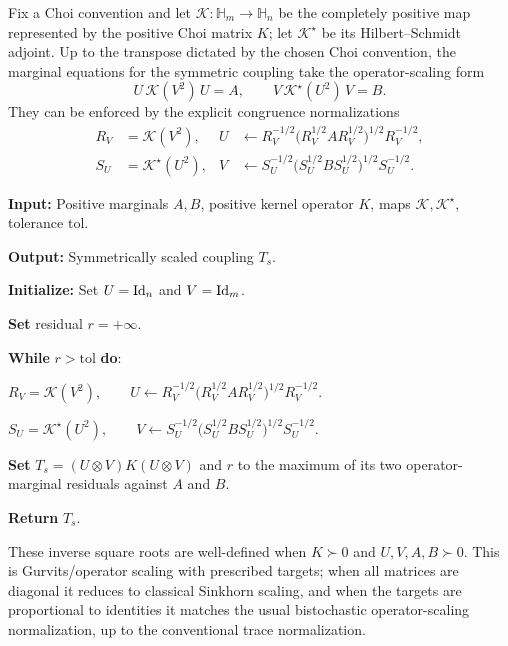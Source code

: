 Fix a Choi convention and let $\mathcal K:\mathbb H_m\to\mathbb H_n$ be the completely positive map represented by the positive Choi matrix $K$; let $\mathcal K^\star$ be its Hilbert--Schmidt adjoint. Up to the transpose dictated by the chosen Choi convention, the marginal equations for the symmetric coupling take the operator-scaling form
\[
	U\,\mathcal K(V^2)\,U=A,
	\qquad
	V\,\mathcal K^\star(U^2)\,V=B.
\]
They can be enforced by the explicit congruence normalizations
\begin{equation}\label{eq-qot-gurvits-updates}
\begin{aligned}
	R_V&=\mathcal K(V^2),
	&
	U&\leftarrow
	R_V^{-1/2}\bigl(R_V^{1/2} A R_V^{1/2}\bigr)^{1/2}R_V^{-1/2},
	\\
	S_U&=\mathcal K^\star(U^2),
	&
	V&\leftarrow
	S_U^{-1/2}\bigl(S_U^{1/2} B S_U^{1/2}\bigr)^{1/2}S_U^{-1/2}.
\end{aligned}
\end{equation}
\begin{alg}\label{alg:quantum-gurvits-scaling}
\textbf{Input:} Positive marginals $A,B$, positive kernel operator $K$, maps $\mathcal K,\mathcal K^\star$, tolerance $\mathrm{tol}$.

\textbf{Output:} Symmetrically scaled coupling $T_s$.

\textbf{Initialize:} Set $U=\mathrm{Id}_n$ and $V=\mathrm{Id}_m$.

\textbf{Set} residual \(r=+\infty\).

\textbf{While} \(r>\mathrm{tol}\) \textbf{do}:
\begin{algblock}
\(R_V=\mathcal K(V^2), \qquad U\leftarrow R_V^{-1/2}\bigl(R_V^{1/2} A R_V^{1/2}\bigr)^{1/2}R_V^{-1/2}.\)

\(S_U=\mathcal K^\star(U^2), \qquad V\leftarrow S_U^{-1/2}\bigl(S_U^{1/2} B S_U^{1/2}\bigr)^{1/2}S_U^{-1/2}.\)

\textbf{Set} \(T_s=(U\otimes V)K(U\otimes V)\) and \(r\) to the maximum of its two operator-marginal residuals against $A$ and $B$.
\end{algblock}
\algreturnskip
\textbf{Return} \(T_s\).
\end{alg}
These inverse square roots are well-defined when $K\succ0$ and $U,V,A,B\succ0$. This is Gurvits/operator scaling with prescribed targets; when all matrices are diagonal it reduces to classical Sinkhorn scaling, and when the targets are proportional to identities it matches the usual bistochastic operator-scaling normalization, up to the conventional trace normalization.


